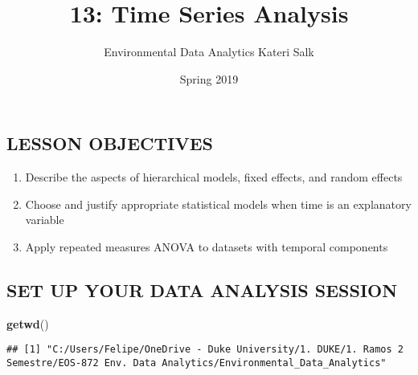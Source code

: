 \documentclass[]{article}
\title{13: Time Series Analysis}
\author{Environmental Data Analytics \textbar{} Kateri Salk}
\date{Spring 2019}
\newenvironment{Shaded}{\begin{snugshade}}{\end{snugshade}}
\newcommand{\KeywordTok}[1]{\textcolor[rgb]{0.13,0.29,0.53}{\textbf{#1}}}
\newcommand{\NormalTok}[1]{#1}
\providecommand{\tightlist}{%
  \setlength{\itemsep}{0pt}\setlength{\parskip}{0pt}}
\begin{document}
\maketitle

\subsection{LESSON OBJECTIVES}\label{lesson-objectives}

\begin{enumerate}
\def\labelenumi{\arabic{enumi}.}
\tightlist
\item
  Describe the aspects of hierarchical models, fixed effects, and random
  effects
\item
  Choose and justify appropriate statistical models when time is an
  explanatory variable
\item
  Apply repeated measures ANOVA to datasets with temporal components
\end{enumerate}

\subsection{SET UP YOUR DATA ANALYSIS
SESSION}\label{set-up-your-data-analysis-session}

\begin{Shaded}
\begin{Highlighting}[]
\KeywordTok{getwd}\NormalTok{()}
\end{Highlighting}
\end{Shaded}

\begin{verbatim}
## [1] "C:/Users/Felipe/OneDrive - Duke University/1. DUKE/1. Ramos 2 Semestre/EOS-872 Env. Data Analytics/Environmental_Data_Analytics"
\end{verbatim}
\end{document}
